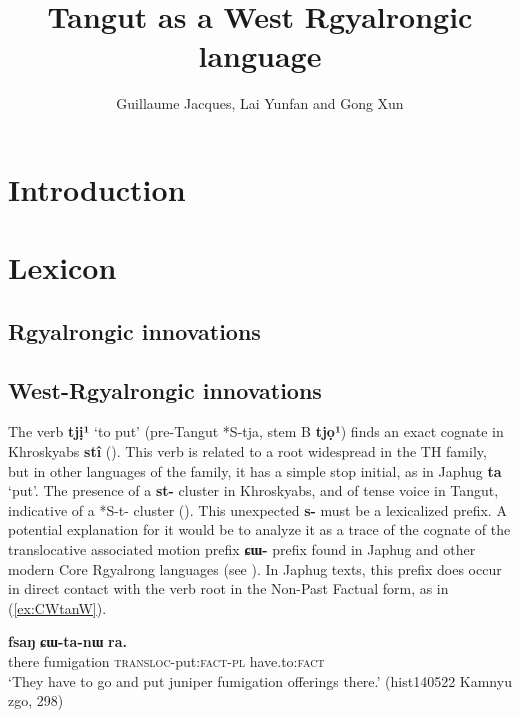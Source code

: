 \documentclass[oneside,a4paper,11pt]{article}
\newcommand{\ipa}[1]{{\phon\textbf{#1}}}
\begin{document}
 
 
 \title{Tangut as a West Rgyalrongic language}
  \author{Guillaume Jacques, Lai Yunfan and Gong Xun}
 \maketitle 
 
\section*{Introduction}

\citet{jackson00sidaba, jackson00puxi}

\section{Lexicon} 
\citet{jacques14esquisse}
\subsection{Rgyalrongic innovations}

\subsection{West-Rgyalrongic innovations}

The verb  \ipa{tjị¹} `to put' (pre-Tangut *S-tja, stem B  \ipa{tjọ¹}) finds an exact cognate in Khroskyabs \ipa{stî} (\citealt{lai17khroskyabs}). This verb is related to a root widespread in the TH family, but in other languages of the family, it has a simple stop initial, as in Japhug \ipa{ta} `put'. The presence of a \ipa{st-} cluster in Khroskyabs, and of tense voice in Tangut, indicative of a *S-t- cluster (\citealt{gong99jinyuanyin}). This unexpected \ipa{s-} must be a lexicalized prefix. A potential explanation for it would be to analyze it as a trace of the cognate of the translocative associated motion prefix \ipa{ɕɯ-} prefix found in Japhug and other modern Core Rgyalrong languages (see \citealt{jacques13harmonization}). In Japhug texts, this prefix does occur in direct contact with the verb root in the Non-Past Factual form, as in (\ref{ex:CWtanW}).

\begin{exe}
\ex \label{ex:CWtanW}
\gll \ipa{nɯtɕu} 	\ipa{fsaŋ} 	\ipa{ɕɯ-ta-nɯ} 	\ipa{ra.}  \\
 there fumigation \textsc{transloc}-put:\textsc{fact-pl} have.to:\textsc{fact} \\
 \glt `They have to go and put juniper fumigation offerings there.' (hist140522 Kamnyu zgo, 298)
\end{exe}
\end{document}
